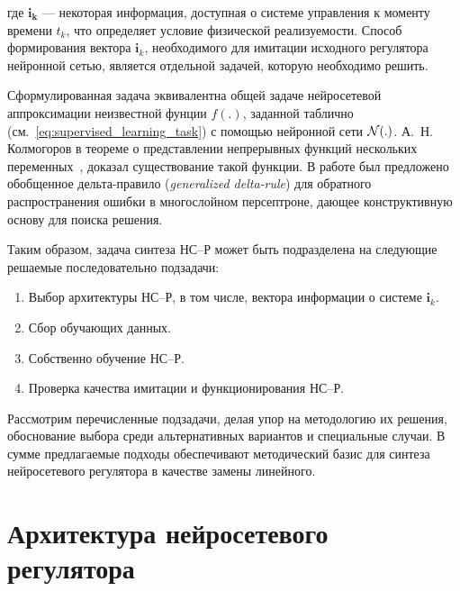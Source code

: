 \noindent где $\mathbf{i_k}$ --- некоторая информация, доступная о
системе управления к моменту времени $t_k$, что определяет условие
физической реализуемости.  Способ формирования вектора $\mathbf{i}_k$,
необходимого для имитации исходного регулятора нейронной сетью,
является отдельной задачей, которую необходимо решить.

Сформулированная задача эквивалентна общей задаче нейросетевой
аппроксимации неизвестной фунции $f(.)$, заданной таблично
(см.~\eqref{eq:supervised_learning_task}) с помощью нейронной сети
$\mathcal{N}(.)$.  А.~Н. Колмогоров в теореме о представлении непрерывных
функций нескольких переменных~\cite{kolmog57}, доказал существование
такой функции.  В работе \cite{rumelhart86} был предложено обобщенное
дельта-правило ({\em generalized delta-rule}) для обратного
распространения ошибки в многослойном персептроне, дающее
конструктивную основу для поиска решения.

Таким образом, задача синтеза НС--Р может быть подразделена на
следующие решаемые последовательно подзадачи:
\begin{enumerate}
\item Выбор архитектуры НС--Р, в том числе, вектора информации о
  системе $\mathbf{i}_k$.
\item Сбор обучающих данных.
\item Собственно обучение НС--Р.
\item Проверка качества имитации и функционирования НС--Р.
\end{enumerate}

Рассмотрим перечисленные подзадачи, делая упор на методологию их
решения, обоснование выбора среди альтернативных вариантов и
специальные случаи.  В сумме предлагаемые подходы обеспечивают
методический базис для синтеза нейросетевого регулятора в качестве
замены линейного.



\section{Архитектура нейросетевого регулятора}\label{nnc_arch}

